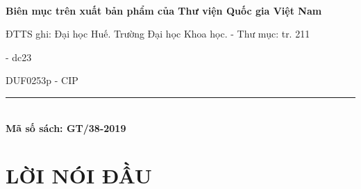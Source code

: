 \newpage
\thispagestyle{empty}

~

\vspace{4cm}
\fontsize{11}{13}\selectfont
{\bf Biên mục trên xuất bản phẩm của Thư viện Quốc gia Việt Nam}\\[0.5cm]
\fontsize{12}{13}\selectfont


ĐTTS ghi: Đại học Huế. Trường Đại học Khoa học. - Thư mục: tr. 211

\indent %

\indent {} - dc23



\begin{center}
DUF0253p - CIP\begin{center}

\end{center}
\end{center}
\vfill
\begin{center}
\rule{5.2cm}{0.25mm}\\
{\bf Mã số sách: GT/38-2019}
\end{center}

\fontsize{12}{13}\selectfont
\cleardoublepage

\chapter*{LỜI NÓI ĐẦU\thispagestyle{fancy}}
\thispagestyle{plain}

